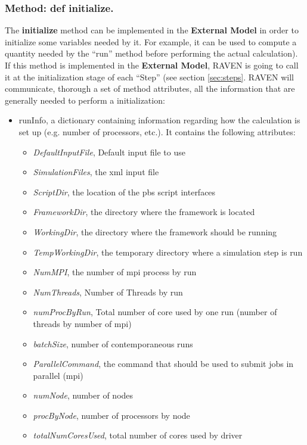 \subsubsection{Method: def initialize.}
\label{subsubsec:externalInitialize}
The \textbf{initialize} method can be implemented in the \textbf{External Model}
in order to initialize some variables needed by it.
%
For example, it can be used to compute a quantity needed by the ``run'' method
before performing the actual calculation).
%
If this method is implemented in the \textbf{External Model}, RAVEN is going to
call it at the initialization stage of each ``Step'' (see section
\ref{sec:steps}.
%
RAVEN will communicate, thorough a set of method attributes, all the information
that are generally needed to perform a initialization:
\begin{itemize}
  \item runInfo, a dictionary containing information regarding how the
  calculation is set up (e.g. number of processors, etc.).
  It contains the following attributes:
  \begin{itemize}
    \item \textit{DefaultInputFile}, Default input file to use
    \item \textit{SimulationFiles}, the xml input file
    \item \textit{ScriptDir}, the location of the pbs script interfaces
    \item \textit{FrameworkDir}, the directory where the framework is located
    \item \textit{WorkingDir}, the directory where the framework should be
    running
    \item \textit{TempWorkingDir}, the temporary directory where a simulation
    step is run
    \item \textit{NumMPI}, the number of mpi process by run
    \item \textit{NumThreads}, Number of Threads by run
    \item \textit{numProcByRun}, Total number of core used by one run (number of
    threads by number of mpi)
    \item \textit{batchSize}, number of contemporaneous runs
    \item \textit{ParallelCommand}, the command that should be used to submit
    jobs in parallel (mpi)
    \item \textit{numNode}, number of nodes
    \item \textit{procByNode}, number of processors by node
    \item \textit{totalNumCoresUsed}, total number of cores used by driver

\end{itemize}
\end{itemize}
